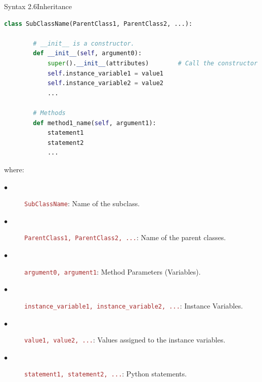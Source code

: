 \documentclass{book}
\begin{document}
    \begin{synBox}{Syntax 2.6}{Inheritance}
        \begin{lstlisting}[language=Python, basicstyle=\ttfamily\small, keywordstyle=\color{blue}, commentstyle=\color{forestgreen}, stringstyle=\color{red}, showstringspaces=false]
    class SubClassName(ParentClass1, ParentClass2, ...):

        # __init__ is a constructor.
        def __init__(self, argument0):
            super().__init__(attributes)        # Call the constructor of the parent class.
            self.instance_variable1 = value1
            self.instance_variable2 = value2
            ...
        
        # Methods
        def method1_name(self, argument1):
            statement1
            statement2
            ...
        \end{lstlisting}
    \raggedright
    where: \\
    \begin{description}
        \item[$\bullet$] \texttt{\textcolor{brown}{SubClassName}}: Name of the subclass.
         \item[$\bullet$] \texttt{\textcolor{brown}{ParentClass1, ParentClass2, ...}}: Name of the parent classes.
         \item[$\bullet$] \texttt{\textcolor{brown}{argument0, argument1}}: Method Parameters (Variables).
         \item[$\bullet$] \texttt{\textcolor{brown}{instance\_variable1, instance\_variable2, ...}}: Instance Variables.
         \item[$\bullet$] \texttt{\textcolor{brown}{value1, value2, ...}}: Values assigned to the instance variables.
         \item[$\bullet$] \texttt{\textcolor{brown}{statement1, statement2, ...}}: Python statements.
    \end{description}
    \end{synBox}
    \newpage
\end{document}
